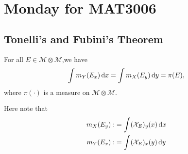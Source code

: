 
\section{Monday for MAT3006}
\subsection{Tonelli's and Fubini's Theorem}

\begin{proposition}\label{pro:14:1}
For all $E\in\mathcal{M}\otimes\mathcal{M}$,we have
\begin{equation}\label{Eq:14:1}
\int m_Y(E_x)\diff x =\int m_X(E_y)\diff y=\pi(E),
\end{equation}
where $\pi(\cdot)$ is a measure on $\mathcal{M}\otimes\mathcal{M}.$
\end{proposition}
Here note that 
\begin{align*}
m_X(E_y):&=\int(\mathcal{X}_E)_y(x)\,\mathrm{d} x\\
m_Y(E_x):&=\int(\mathcal{X}_E)_x(y)\,\mathrm{d} y
\end{align*}

